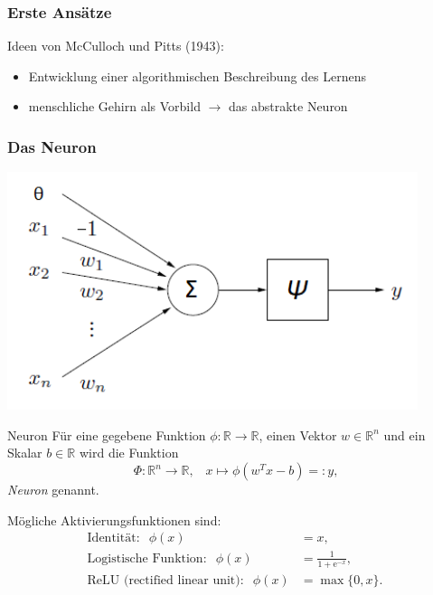 \documentclass[10pt]{beamer} %
\newcommand{\RR}{\ensuremath{\mathbb{R}}}
\newcommand{\Rnv}{\ensuremath{\mathbb{R}^{n}}}
\begin{document}
\begin{frame}
  \frametitle{Erste Ansätze}
Ideen von McCulloch und Pitts (1943):
\begin{itemize}
   \item Entwicklung einer algorithmischen Beschreibung des Lernens
   \item menschliche Gehirn als Vorbild $\rightarrow$ das abstrakte Neuron
\end{itemize}
\end{frame}

\begin{frame}
   \frametitle[]{Das Neuron}
   \includegraphics[width=0.9\textwidth]{pics/perzeptron.png}
\end{frame}

\begin{frame}
   \begin{block}{Neuron}
      \label{def_neuron}
      Für eine gegebene Funktion $\phi: \RR \rightarrow \RR$, einen Vektor $w \in \Rnv$ und ein Skalar $b \in \RR$ wird die Funktion 
      \[ \
      \Phi: \RR^n \rightarrow \RR, \; \; \; x \mapsto \phi(w^T x -b)=:y,
      \]
      \textit{Neuron} genannt.
   \end{block}
   \pause
   Mögliche Aktivierungsfunktionen sind:
   \begin{align*}
      \text{Identität}: \; \;\phi(x)&=x, \\
      \text{Logistische Funktion}: \; \;\phi(x)&=\frac{1}{1+\mathrm{e}^{-x}}, \\
      \text{ReLU (rectified linear unit)}: \; \;\phi(x)&=\max\{0,x\}.
  \end{align*}
\end{frame}
\end{document}
